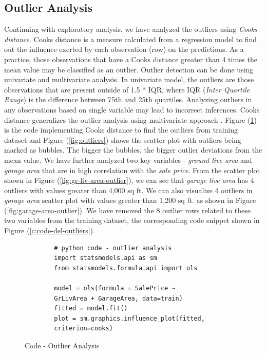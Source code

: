 \documentclass[sigconf]{acmart}
\begin{document}
	\subsection{Outlier Analysis}
	
	Continuing with exploratory analysis, we have analyzed the outliers using {\em Cooks distance}. Cooks distance is a measure calculated from a regression model to find out the influence exerted by each observation (row) on the predictions. As a practice,  those observations that have a Cooks distance greater than 4 times the mean value may be classified as an outlier. Outlier detection can be done using univariate and multivariate analysis. In univariate model, the outliers are those observations that are present outside of 1.5 * IQR, where IQR ({\em Inter Quartile Range}) is the difference between 75th and 25th quartiles. Analyzing outliers in any observations based on single variable may lead to incorrect inferences. Cooks distance generalizes the outlier analysis using multivariate approach \cite{1}. Figure (\ref{c:code-outliers}) is the code implementing Cooks distance to find the outliers from training dataset and Figure (\ref{fig:outliers}) shows the scatter plot with outliers being marked as bubbles. The bigger the bubbles, the bigger outlier deviations from the mean value. We have further analyzed two key variables - {\em ground live area} and {\em garage area} that are in high correlation with the {\em sale price}. From the scatter plot shown in Figure (\ref{fig:gr-liv-area-outlier}), we can see that {\em garage live area} has 4 outliers with values greater than 4,000 sq ft. We can also visualize 4 outliers in {\em garage area} scatter plot with values greater than 1,200 sq ft. as shown in Figure (\ref{fig:garage-area-outlier}).  We have removed the 8 outlier rows related to these two variables from the training dataset, the corresponding code snippet shown in Figure (\ref{c:code-del-outliers}).
	
	\begin{figure}[htb]		
		\begin{verbatim}	
		# python code - outlier analysis
		import statsmodels.api as sm
		from statsmodels.formula.api import ols
		
		model = ols(formula = SalePrice ~ 
		GrLivArea + GarageArea, data=train)
		fitted = model.fit()    	
		plot = sm.graphics.influence_plot(fitted, 
		criterion=cooks)		
		\end{verbatim}
		\caption{Code - Outlier Analysis} \label{c:code-outliers} 
	\end{figure}
	
\end{document}
